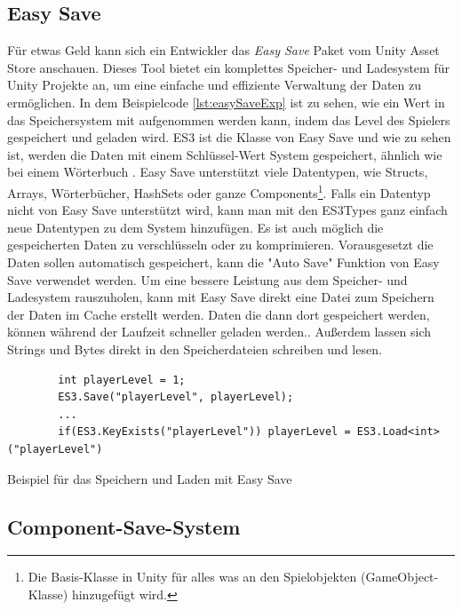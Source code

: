\subsection{Easy Save}
Für etwas Geld kann sich ein Entwickler das \textit{Easy Save} Paket vom Unity Asset Store anschauen. Dieses Tool bietet ein komplettes Speicher- und Ladesystem für Unity Projekte an, um eine einfache und effiziente Verwaltung der Daten zu ermöglichen.\cite{unityEasySave} In dem Beispielcode \ref{lst:easySaveExp} ist zu sehen, wie ein Wert in das Speichersystem mit aufgenommen werden kann, indem das Level des Spielers gespeichert und geladen wird. ES3 ist die Klasse von Easy Save und wie zu sehen ist, werden die Daten mit einem Schlüssel-Wert System gespeichert, ähnlich wie bei einem Wörterbuch .\cite{moodkieGettingStarted} Easy Save unterstützt viele Datentypen, wie Structs, Arrays, Wörterbücher, HashSets oder ganze Components\footnote{Die Basis-Klasse in Unity für alles was an den Spielobjekten (GameObject-Klasse) hinzugefügt wird.\cite{unityComponent}}.\cite{moodkieSupportedTypes} Falls ein Datentyp nicht von Easy Save unterstützt wird, kann man mit den ES3Types ganz einfach neue Datentypen zu dem System hinzufügen.\cite{moodkieChoosingWhat} Es ist auch möglich die gespeicherten Daten zu verschlüsseln oder zu komprimieren.\cite{moodkieGettingStarted} Vorausgesetzt die Daten sollen automatisch gespeichert, kann die "Auto Save" Funktion von Easy Save verwendet werden.\cite{moodkieAutoSave} Um eine bessere Leistung aus dem Speicher- und Ladesystem rauszuholen, kann mit Easy Save direkt eine Datei zum Speichern der Daten im Cache erstellt werden. Daten die dann dort gespeichert werden, können während der Laufzeit schneller geladen werden.\cite{moodkieImprovingPerformance}. Außerdem lassen sich Strings und Bytes direkt in den Speicherdateien schreiben und lesen.\cite{moodkieSavingLoading} 

\begin{listing}[htp]
    \begin{verbatim} 
        int playerLevel = 1;
        ES3.Save("playerLevel", playerLevel);
        ... 
        if(ES3.KeyExists("playerLevel")) playerLevel = ES3.Load<int>("playerLevel")
    \end{verbatim}
    \caption{Beispiel für das Speichern und Laden mit Easy Save}
    \label{lst:easySaveExp}
\end{listing}

\subsection{Component-Save-System}

